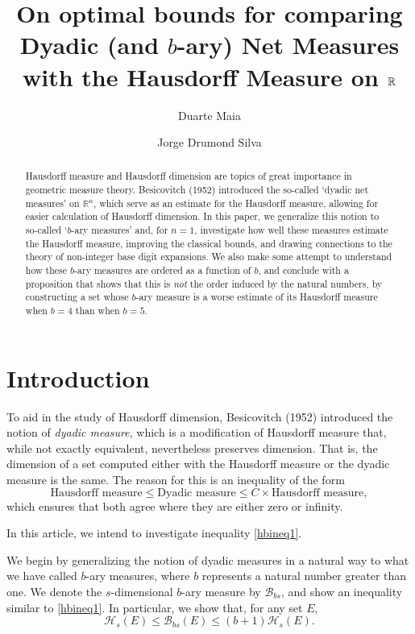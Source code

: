 \documentclass[11pt, reqno]{amsart}
\title[\textbf{Optimal bounds for $b$-ary measures}]{\textbf{On optimal bounds for comparing Dyadic (and $b$-ary) Net Measures with the Hausdorff Measure on $\R$}}
\author{Duarte Maia}
\author{Jorge Drumond Silva}
\date{}
\newcommand{\R}{\mathbb{R}}
\newcommand{\HH}{\mathcal{H}}
\newcommand{\BB}{\mathcal{B}}
\begin{document}
\begin{abstract}
Hausdorff measure and Hausdorff dimension are topics of great importance in geometric measure theory. Besicovitch (1952) introduced the so-called `dyadic net measures' on $\R^n$, which serve as an estimate for the Hausdorff measure, allowing for easier calculation of Hausdorff dimension. In this paper, we generalize this notion to so-called `$b$-ary measures' and, for $n = 1$, investigate how well these measures estimate the Hausdorff measure, improving the classical bounds, and drawing connections to the theory of non-integer base digit expansions. We also make some attempt to understand how these $b$-ary measures are ordered as a function of $b$, and conclude with a proposition that shows that this is \emph{not} the order induced by the natural numbers, by constructing a set whose $b$-ary measure is a worse estimate of its Hausdorff measure when $b = 4$ than when $b = 5$.
\end{abstract}

\maketitle

\section{Introduction}

To aid in the study of Hausdorff dimension, Besicovitch (1952) introduced the notion of \emph{dyadic measure}, which is a modification of Hausdorff measure that, while not exactly equivalent, nevertheless preserves dimension. 
That is, the dimension of a set computed either with the Hausdorff measure or the dyadic measure is the same. The reason for this is an inequality of the form
\begin{equation}\label{hbineq1}
\text{Hausdorff measure} \leq \text{Dyadic measure} \leq C \times \text{Hausdorff measure},
\end{equation}
which ensures that both agree where they are either zero or infinity.

In this article, we intend to investigate inequality \eqref{hbineq1}.

We begin by generalizing the notion of dyadic measures in a natural way to what we have called $b$-ary measures, where $b$ represents a natural number greater than one. We denote the $s$-dimensional $b$-ary measure by $\BB_{bs}$, and show an inequality similar to \eqref{hbineq1}. In particular, we show that, for any set $E$,
\begin{equation}\label{hbineq2}
\HH_s(E) \leq \BB_{bs}(E) \leq (b+1) \HH_s(E).
\end{equation}
\end{document}
